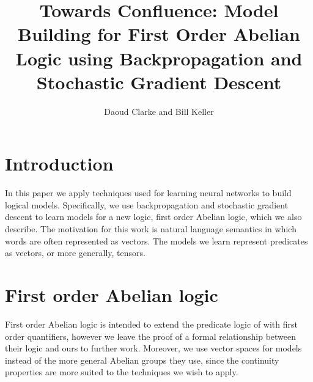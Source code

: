 \documentclass{article}
\title{Towards Confluence: Model Building for First Order Abelian
  Logic using Backpropagation and Stochastic Gradient Descent}
\author{Daoud Clarke and Bill Keller}
\begin{document}
\maketitle

\section{Introduction}

In this paper we apply techniques used for learning neural networks to
build logical models. Specifically, we use backpropagation and
stochastic gradient descent to learn models for a new logic, first
order Abelian logic, which we also describe. The motivation for this
work is natural language semantics in which words are often
represented as vectors. The models we learn represent predicates as
vectors, or more generally, tensors.

\section{First order Abelian logic}

First order Abelian logic is intended to extend the predicate logic of
\cite{Meyer:89} with first order quantifiers, however we leave the
proof of a formal relationship between their logic and ours to further
work. Moreover, we use vector spaces for models instead of the more
general Abelian groups they use, since the continuity properties are
more suited to the techniques we wish to apply.
\end{document}
